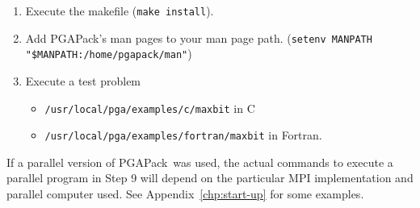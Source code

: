 \documentclass{report}
\newcommand{\pga}{PGAPack}
\begin{document}
\begin{enumerate}
\begin{sloppypar}
The full {\tt configure} options are {\tt configure -arch ARCH\_TYPE [-cc CC] 
[-cflags CFLAGS] [-f77 FC] [-fflags FFLAGS] [-debug]
[-mpiinc MPI\_INCLUDE\_DIRECTORY] [-mpilib MPI\_LIBRARY]  [-help]}
where all parameters except {\tt -arch} are
optional and do the following:
\end{sloppypar}
\begin{itemize}
\item {\tt -cc}: The name of the ANSI C compiler, {\tt cc} by
default.
\item {\tt -cflags}: Options passed to the C compiler.
\item {\tt -f77}:  The name of the Fortran 77 compiler, {\tt f77} by
default. (The Fortran compiler is used only to compile the Fortran
examples in the {\tt ./examples/fortran} directory.)
\item {\tt -fflags}: Options passed to the Fortran compiler.
\item {\tt -debug}: If specified, enables the debugging features (see
Chapter~\ref{chp:debug}) and compiles the source code with the {\tt -g} flag.
If this flag is not specified the debugging features are disabled, and
the library is compiled with the {\tt -O} flag
\item {\tt -mpiinc}: The {\em directory} where MPI include files are located.
\item {\tt -mpilib}: The {\em full path} to the MPI library.
\end{itemize}
If {\tt -mpiinc} and  {\tt -mpilib} are specified, {\em a parallel version} of
\pga\ will be built.  If these flags are not specified, a {\em sequential
version} of \pga\ will be built.
\item Execute the makefile ({\tt make install}).
\item Add \pga's man pages to your man page path.
({\tt\small setenv MANPATH "\$MANPATH:/home/pgapack/man"})
\item Execute a test problem
\begin{itemize}
\item {\tt /usr/local/pga/examples/c/maxbit} in C
\item {\tt /usr/local/pga/examples/fortran/maxbit} in Fortran.
\end{itemize}
\end{enumerate}

If a parallel version of \pga\ was used, the actual commands to execute a
parallel program in Step 9 will depend on the particular MPI implementation
and parallel computer used.  See Appendix~\ref{chp:start-up} for some
examples.
\end{document}
